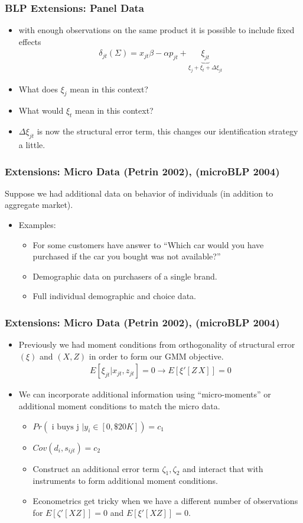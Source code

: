 \documentclass[xcolor=pdftex,dvipsnames,table,mathserif]{beamer}
\begin{document}
\begin{frame}
\frametitle{BLP Extensions: Panel Data}
\begin{itemize}
\item with enough observations on the same product it is possible to include fixed effects
\begin{eqnarray*}
\delta_{jt}(\Sigma) = x_{jt} \beta - \alpha p_{jt} + \underbrace{\xi_{jt}}_{\xi_{j} + \xi_t + \Delta \xi_{jt}}
\end{eqnarray*}
\item What does $\xi_{j}$ mean in this context?
\item What would $\xi_t$ mean in this context?
\item $\Delta \xi_{jt}$ is now the structural error term, this changes our identification strategy a little.
\end{itemize}
\end{frame}

\begin{frame}
\frametitle{Extensions: Micro Data (Petrin 2002), (microBLP 2004)}
Suppose we had additional data on behavior of individuals (in addition to aggregate market).
\begin{itemize}
\item Examples:
\begin{itemize}
\item For some customers have answer to ``Which car would you have purchased if the car you bought was not available?''
\item Demographic data on purchasers of a single brand.
\item Full individual demographic and choice data.
\end{itemize}
\end{itemize}
\end{frame}

\begin{frame} \frametitle{Extensions: Micro Data (Petrin 2002), (microBLP 2004)}
\begin{itemize}
\item Previously we had moment conditions from orthogonality of structural error $(\xi)$ and $(X,Z)$ in order to form our GMM objective.
\begin{eqnarray*}
E[\xi_{jt} | x_{jt}, z_{jt}]=0 \rightarrow E[\xi'  [Z \, X]]=0
\end{eqnarray*}
\item We can incorporate additional information using ``micro-moments'' or additional moment conditions to match the micro data.
\begin{itemize}
\item $Pr(\mbox{ i buys j } | y_i \in [0,\$20K])= c_1$
\item $Cov(d_i, s_{ijt}) = c_2$
\item Construct an additional error term $\zeta_1,\zeta_2$ and interact that with instruments to form additional moment conditions.
\item Econometrics get tricky when we have a different number of observations for $E[\zeta' [X Z]]=0$ and $E[\xi' [X Z]]=0$.
\end{itemize}
\end{itemize}
\end{frame}
\end{document}
